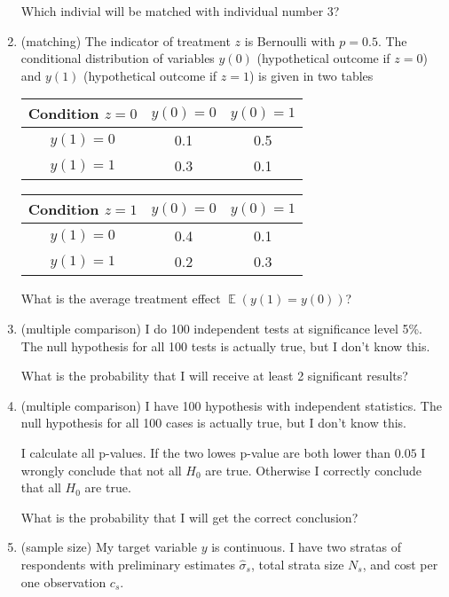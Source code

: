 \documentclass[12pt]{article}
\DeclareMathOperator{\E}{\mathbb{E}}
\begin{document}
\begin{enumerate}
    Which indivial will be matched with individual number 3?
    

    \item (matching) The indicator of treatment $z$ is Bernoulli with $p=0.5$. 
    The conditional distribution of variables $y(0)$ (hypothetical outcome if $z =0$) and $y(1)$ (hypothetical outcome if $z=1$) 
    is given in two tables

    \begin{tabular}{ccc}
    \toprule
    Condition $z = 0$ & $y(0) = 0$ & $y(0) = 1$ \\
    \midrule
    $y(1)=0$ & 0.1 & 0.5 \\
    $y(1)=1$ & 0.3 & 0.1 \\
    \bottomrule
    \end{tabular}

    \begin{tabular}{ccc}
        \toprule
        Condition $z = 1$ & $y(0) = 0$ & $y(0) = 1$ \\
        \midrule
        $y(1)=0$ & 0.4 & 0.1 \\
        $y(1)=1$ & 0.2 & 0.3 \\
        \bottomrule
    \end{tabular}

    What is the average treatment effect $\E(y(1) = y(0))$?


    \item (multiple comparison) I do 100 independent tests at significance level 5\%. 
    The null hypothesis for all 100 tests is actually true, but I don't know this. 
    
    What is the probability that I will receive at least 2 significant results?
    
    \item (multiple comparison) I have 100 hypothesis with independent statistics. 
    The null hypothesis for all 100 cases is actually true, but I don't know this. 
    
    I calculate all p-values. 
    If the two lowes p-value are both lower than $0.05$ I wrongly conclude that not all $H_0$ are true. 
    Otherwise I correctly conclude that all $H_0$ are true. 

    What is the probability that I will get the correct conclusion?
    
    \item (sample size) My target variable $y$ is continuous. 
    I have two stratas of respondents with preliminary estimates $\hat\sigma_s$, 
    total strata size $N_s$, and cost per one observation $c_s$.


\end{enumerate}
\end{document}
